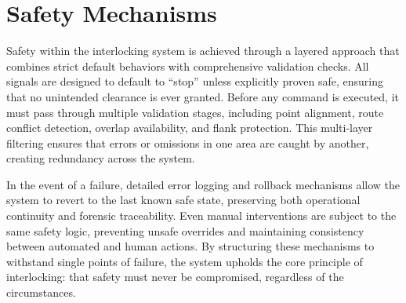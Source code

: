 \section{Safety Mechanisms}

\label{sec:system-overview:safety}

Safety within the interlocking system is achieved through a layered approach that combines strict default behaviors with comprehensive validation checks. All signals are designed to default to “stop” unless explicitly proven safe, ensuring that no unintended clearance is ever granted. Before any command is executed, it must pass through multiple validation stages, including point alignment, route conflict detection, overlap availability, and flank protection. This multi-layer filtering ensures that errors or omissions in one area are caught by another, creating redundancy across the system.

In the event of a failure, detailed error logging and rollback mechanisms allow the system to revert to the last known safe state, preserving both operational continuity and forensic traceability. Even manual interventions are subject to the same safety logic, preventing unsafe overrides and maintaining consistency between automated and human actions. By structuring these mechanisms to withstand single points of failure, the system upholds the core principle of interlocking: that safety must never be compromised, regardless of the circumstances.